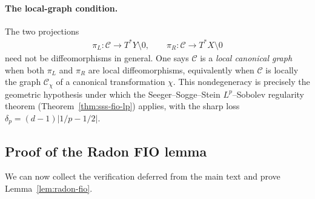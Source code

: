 \documentclass[12pt]{article}
\numberwithin{equation}{section}
\numberwithin{figure}{section}
\numberwithin{equation}{section}
\newcommand{\abs}[1]{\left|#1\right|}
\begin{document}
\paragraph{The local-graph condition.}
The two projections
\begin{align*}
    \pi_L:\mathcal{C}\to T^*Y\setminus0,
    \qquad
    \pi_R:\mathcal{C}\to T^*X\setminus0
\end{align*}
need not be diffeomorphisms in general.  One says $\mathcal{C}$ is a \emph{local canonical
graph} when both $\pi_L$ and $\pi_R$ are local diffeomorphisms, equivalently when
$\mathcal{C}$ is locally the graph $\mathcal{C}_\chi$ of a canonical transformation $\chi$.  This
nondegeneracy is precisely the geometric hypothesis under which the
Seeger--Sogge--Stein $L^p$--Sobolev regularity theorem
(Theorem~\ref{thm:sss-fio-lp}) applies, with the sharp loss
$\delta_p=(d-1)\abs{1/p-1/2}$.

\subsection{Proof of the Radon FIO lemma}
\label{app:radon-fio-proof}

We can now collect the verification deferred from the main text and prove
Lemma~\ref{lem:radon-fio}.
\end{document}
